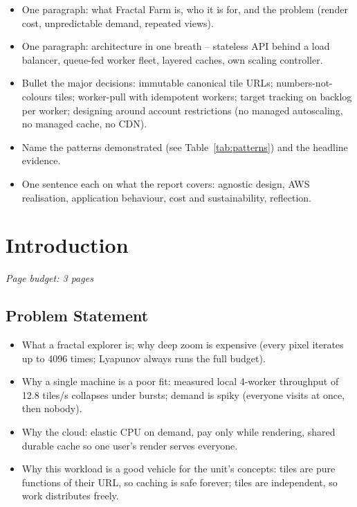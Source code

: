 \documentclass[a4paper,12pt]{article}
\newcommand{\budget}[1]{\hfill{\small\textcolor{mutedText}{\emph{Page budget: #1}}}\par}
\begin{document}
\begin{yourwriting}
\begin{itemize}
    \item One paragraph: what Fractal Farm is, who it is for, and the problem (render cost, unpredictable demand, repeated views).
    \item One paragraph: architecture in one breath -- stateless API behind a load balancer, queue-fed worker fleet, layered caches, own scaling controller.
    \item Bullet the major decisions: immutable canonical tile URLs; numbers-not-colours tiles; worker-pull with idempotent workers; target tracking on backlog per worker; designing around account restrictions (no managed autoscaling, no managed cache, no CDN).
    \item Name the patterns demonstrated (see Table~\ref{tab:patterns}) and the headline evidence.
    \item One sentence each on what the report covers: agnostic design, AWS realisation, application behaviour, cost and sustainability, reflection.
\end{itemize}
\end{yourwriting}

\newpage
\tableofcontents
\listoffigures
\listoftables
\newpage
{}

\section{Introduction}
\budget{3 pages}

\subsection{Problem Statement}

\begin{yourwriting}
\begin{itemize}
    \item What a fractal explorer is; why deep zoom is expensive (every pixel iterates up to 4096 times; Lyapunov always runs the full budget).
    \item Why a single machine is a poor fit: measured local 4-worker throughput of 12.8 tiles/s collapses under bursts; demand is spiky (everyone visits at once, then nobody).
    \item Why the cloud: elastic CPU on demand, pay only while rendering, shared durable cache so one user's render serves everyone.
    \item Why this workload is a good vehicle for the unit's concepts: tiles are pure functions of their URL, so caching is safe forever; tiles are independent, so work distributes freely.
\end{itemize}
\end{yourwriting}
\end{document}
